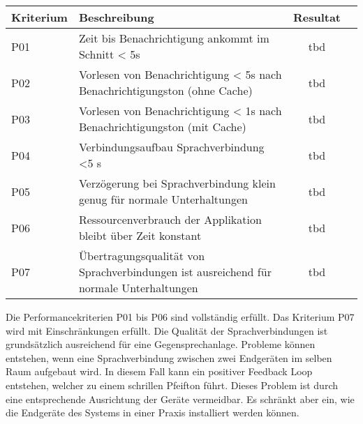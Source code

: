 \begin{table}[h]
    \centering
    \begin{tabular}{|l|p{11cm}|c|c|}
        \hline
        \textbf{Kriterium} & \textbf{Beschreibung} & \textbf{Resultat} \\
        \hline
        P01         & Zeit bis Benachrichtigung ankommt im Schnitt < 5s & tbd\\
        \hline
        P02         & Vorlesen von Benachrichtigung < 5s nach Benachrichtigungston (ohne Cache) & tbd\\
        \hline
        P03         & Vorlesen von Benachrichtigung < 1s nach Benachrichtigungston (mit Cache) & tbd\\
        \hline
        P04         & Verbindungsaufbau Sprachverbindung <5 s  & tbd\\
        \hline
        P05         & Verzögerung bei Sprachverbindung klein genug für normale Unterhaltungen & tbd\\
        \hline
        P06         & Ressourcenverbrauch der Applikation bleibt über Zeit konstant & tbd\\
        \hline
        P07         & Übertragungsqualität von Sprachverbindungen ist ausreichend für normale Unterhaltungen & tbd\\
        \hline
    \end{tabular}\label{tab:testplan_performance}
\end{table}

Die Performancekriterien P01 bis P06 sind vollständig erfüllt.
Das Kriterium P07 wird mit Einschränkungen erfüllt.
Die Qualität der Sprachverbindungen ist grundsätzlich ausreichend für eine Gegensprechanlage.
Probleme können entstehen, wenn eine Sprachverbindung zwischen zwei Endgeräten im selben Raum aufgebaut wird.
In diesem Fall kann ein positiver Feedback Loop entstehen, welcher zu einem schrillen Pfeifton führt.
Dieses Problem ist durch eine entsprechende Ausrichtung der Geräte vermeidbar.
Es schränkt aber ein, wie die Endgeräte des Systems in einer Praxis installiert werden können.

\clearpage
